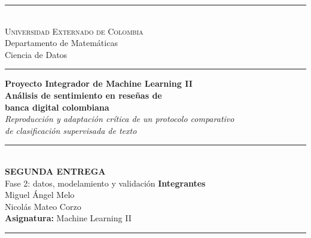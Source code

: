 \documentclass[11pt,a4paper]{article}
\newif\ifborrador
\begin{document}
\begin{titlepage}
\centering
\vspace*{1.5cm}
{\color{verde}\rule{\linewidth}{1.5pt}}\\[0.5em]
{\scshape\color{verde}Universidad Externado de Colombia}\\[0.2em]
{\small\color{gray}Departamento de Matemáticas\\Ciencia de Datos}\\[0.3em]
{\color{verde}\rule{\linewidth}{0.5pt}}
\vspace{3cm}

{\large\bfseries\color{verde}Proyecto Integrador de Machine Learning II}\\[1.2em]
{\LARGE\bfseries Análisis de sentimiento en reseñas de\\[0.2em] banca digital colombiana}\\[1em]
{\itshape Reproducción y adaptación crítica de un protocolo comparativo\\ de clasificación supervisada de texto}\\[1.5em]
{\color{dorado}\rule{0.45\linewidth}{1pt}}\\[1.5em]
{\bfseries SEGUNDA ENTREGA}\\[0.3em]
Fase 2: datos, modelamiento y validación
\vfill
{\bfseries\color{verde}Integrantes}\\[0.5em]
Miguel Ángel Melo\\[0.3em]
Nicolás Mateo Corzo\\[1.5em]
\textbf{Asignatura:} Machine Learning II\\[1cm]
{\color{verde}\rule{\linewidth}{1.5pt}}
\end{titlepage}

\ifborrador
\begin{tcolorbox}[colback=aviso!8,colframe=aviso,title=\textbf{BORRADOR, no entregar},fonttitle=\small,fontupper=\small]
Las cifras de acuerdo entre anotadores de la sección 1.2 (kappa de Cohen) provienen de
\textbf{respuestas simuladas} por \texttt{src/simular\_anotacion.py}, no de una anotación real.
Sirven para ensayar el flujo y ver cómo queda el documento. Al llenar las hojas de verdad, basta
poner \texttt{\textbackslash borradorfalse} para que este aviso y esas cifras desaparezcan.
\end{tcolorbox}
\fi
\end{document}

